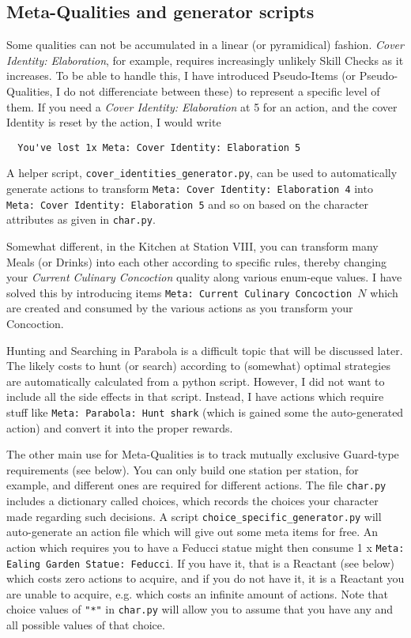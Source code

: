 \documentclass[a4paper,11pt,openright,twoside]{scrartcl}
\begin{document}
\subsection{Meta-Qualities and generator scripts}

Some qualities can not be accumulated in a linear (or pyramidical) fashion. \emph{Cover Identity: Elaboration}, for example, requires increasingly unlikely Skill Checks as it increases. To be able to handle this, I have introduced Pseudo-Items (or Pseudo-Qualities, I do not differenciate between these) to represent a specific level of them. If you need a \emph{Cover Identity: Elaboration} at 5 for an action, and the cover Identity is reset by the action, I would write
\begin{lstlisting}
  You've lost 1x Meta: Cover Identity: Elaboration 5
\end{lstlisting}

A helper script, \texttt{cover\_identities\_generator.py}, can be used to automatically generate actions to transform \texttt{Meta: Cover Identity: Elaboration 4} into \texttt{Meta: Cover Identity: Elaboration 5} and so on based on the character attributes as given in \texttt{char.py}.

Somewhat different, in the Kitchen at Station VIII, you can transform many Meals (or Drinks) into each other according to specific rules, thereby changing your \emph{Current Culinary Concoction} quality along various enum-eque values. I have solved this by introducing items \texttt{Meta: Current Culinary Concoction $N$} which are created and consumed by the various actions as you transform your Concoction.

Hunting and Searching in Parabola is a difficult topic that will be discussed later. The likely costs to hunt (or search) according to (somewhat) optimal strategies are automatically calculated from a python script. However, I did not want to include all the side effects in that script. Instead, I have actions which require stuff like  \texttt{Meta: Parabola: Hunt shark} (which is gained some the auto-generated action) and convert it into the proper rewards. 

The other main use for Meta-Qualities is to track mutually exclusive Guard-type requirements (see below). You can only build one station per station, for example, and different ones are required for different actions. The file \texttt{char.py} includes a dictionary called choices, which records the choices your character made regarding such decisions. A script \texttt{choice\_specific\_generator.py} will auto-generate an action file which will give out some meta items for free. An action which requires you to have a Feducci statue might then consume  1 x \texttt{Meta: Ealing Garden Statue: Feducci}. If you have it, that is a Reactant (see below) which costs zero actions to acquire, and if you do not have it, it is a Reactant you are unable to acquire, e.g. which costs an infinite amount of actions. Note that choice values of \texttt{"*"} in \texttt{char.py} will allow you to assume that you have any and all possible values of that choice.
\end{document}
